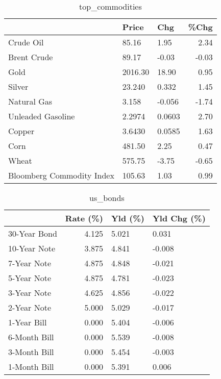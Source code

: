 \documentclass{article}%
\begin{document}
\begin{table}[htbp]%
\caption{top\_commodities}%
\centering%
\begin{adjustbox}{width=1\textwidth}%
\begin{tabular}{lllr}
\toprule
                          &   Price &    Chg &  \%Chg \\
\midrule
               Crude Oil  &   85.16 &   1.95 &  2.34 \\
             Brent Crude  &   89.17 &  -0.03 & -0.03 \\
                    Gold  & 2016.30 &  18.90 &  0.95 \\
                  Silver  &  23.240 &  0.332 &  1.45 \\
             Natural Gas  &   3.158 & -0.056 & -1.74 \\
       Unleaded Gasoline  &  2.2974 & 0.0603 &  2.70 \\
                  Copper  &  3.6430 & 0.0585 &  1.63 \\
                    Corn  &  481.50 &   2.25 &  0.47 \\
                   Wheat  &  575.75 &  -3.75 & -0.65 \\
Bloomberg Commodity Index &  105.63 &   1.03 &  0.99 \\
\bottomrule
\end{tabular}
%
\end{adjustbox}%
\end{table}

%


\begin{table}[htbp]%
\caption{us\_bonds}%
\centering%
\begin{adjustbox}{width=1\textwidth}%
\begin{tabular}{lrll}
\toprule
             &  Rate (\%) & Yld (\%) & Yld Chg (\%) \\
\midrule
30-Year Bond &     4.125 &   5.021 &       0.031 \\
10-Year Note &     3.875 &   4.841 &      -0.008 \\
 7-Year Note &     4.875 &   4.848 &      -0.021 \\
 5-Year Note &     4.875 &   4.781 &      -0.023 \\
 3-Year Note &     4.625 &   4.856 &      -0.022 \\
 2-Year Note &     5.000 &   5.029 &      -0.017 \\
 1-Year Bill &     0.000 &   5.404 &      -0.006 \\
6-Month Bill &     0.000 &   5.539 &      -0.008 \\
3-Month Bill &     0.000 &   5.454 &      -0.003 \\
1-Month Bill &     0.000 &   5.391 &       0.006 \\
\bottomrule
\end{tabular}
%
\end{adjustbox}%
\end{table}
\end{document}
